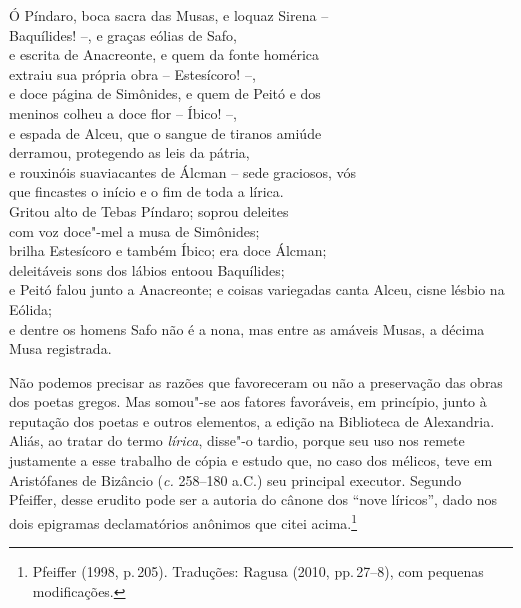 {\setlength{\epigraphwidth}{.7\textwidth}
\epigraph{Ó Píndaro, boca sacra das Musas, e loquaz Sirena -- \\
Baquílides! --, e graças eólias de Safo, \\
e escrita de Anacreonte, e quem da fonte homérica \\
extraiu sua própria obra -- Estesícoro! --, \\
e doce página de Simônides, e quem de Peitó\footnotemark{} e dos \\
meninos colheu a doce flor -- Íbico! --, \\
e espada de Alceu, que o sangue de tiranos amiúde \\
derramou, protegendo as leis da pátria, \\
e rouxinóis suaviacantes de Álcman -- sede \qb{}graciosos, vós \\
que fincastes o início e o fim de toda a lírica.\footnotemark{} \\ \bigskip
Gritou alto de Tebas Píndaro; soprou deleites \\
com voz doce"-mel a musa de Simônides; \\
brilha Estesícoro e também Íbico; era doce Álcman; \\
deleitáveis sons dos lábios entoou Baquílides; \\
e Peitó falou junto a Anacreonte; e coisas variegadas canta Alceu, cisne lésbio na Eólida; \\
e dentre os homens Safo não é a nona, mas entre as amáveis Musas, a décima Musa registrada.\footnotemark}{}
}

\setcounter{footnote}{141}

\setcounter{footnote}{142}

\setcounter{footnote}{143}

\noindent{}Não podemos precisar as razões que favoreceram ou não a
preservação das obras dos poetas gregos. Mas somou"-se aos fatores favoráveis,
em princípio, junto à reputação dos poetas e outros elementos, a edição na
Biblioteca de Alexandria. Aliás, ao tratar do termo \textit{lírica}, disse"-o
tardio, porque seu uso nos remete justamente a esse trabalho de cópia e estudo
que, no caso dos mélicos, teve em Aristófanes de Bizâncio
(\textit{c.} 258--180 a.C.) seu principal executor. Segundo Pfeiffer, desse
erudito pode ser a autoria do cânone dos “nove líricos”,
dado nos dois epigramas declamatórios anônimos que citei
acima.\footnote{Pfeiffer (1998, p.\,205). Traduções: Ragusa (2010, pp.\,27--8), com pequenas modificações.}


